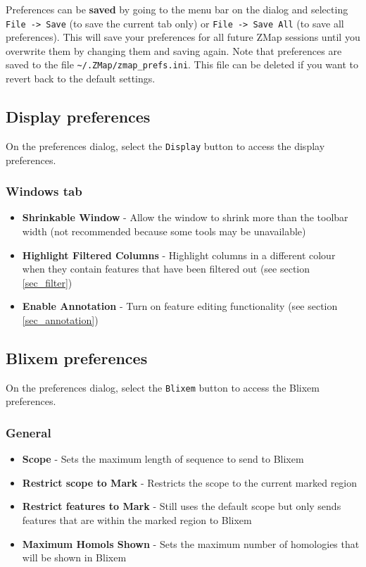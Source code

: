 \documentclass[letterpaper]{article}
\begin{document}
Preferences can be \textbf{saved} by going to the menu bar on the dialog and selecting \lstinline{File -> Save} (to save the current tab only) or \lstinline{File -> Save All} (to save all preferences). This will save your preferences for all future ZMap sessions until you overwrite them by changing them and saving again. Note that preferences are saved to the file \lstinline{~/.ZMap/zmap_prefs.ini}. This file can be deleted if you want to revert back to the default settings.


\subsection{Display preferences} \label{sec_preferences_display}
On the preferences dialog, select the \lstinline{Display} button to access the display preferences.

\subsubsection{Windows tab}
\begin{itemize}
\item \textbf{Shrinkable Window} - Allow the window to shrink more than the toolbar width (not recommended because some tools may be unavailable)
\item \textbf{Highlight Filtered Columns} - Highlight columns in a different colour when they contain features that have been filtered out (see section \ref{sec_filter})
\item \textbf{Enable Annotation} - Turn on feature editing functionality (see section \ref{sec_annotation})
\end{itemize}


\subsection{Blixem preferences} \label{sec_preferences_blixem}
On the preferences dialog, select the \lstinline{Blixem} button to access the Blixem preferences.

\subsubsection{General}
\begin{itemize}
\item \textbf{Scope} - Sets the maximum length of sequence to send to Blixem
\item \textbf{Restrict scope to Mark} - Restricts the scope to the current marked region
\item \textbf{Restrict features to Mark} - Still uses the default scope but only sends features that are within the marked region to Blixem
\item \textbf{Maximum Homols Shown} - Sets the maximum number of homologies that will be shown in Blixem
\end{itemize}
\end{document}
